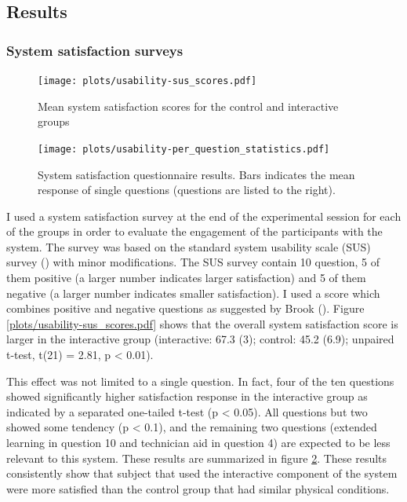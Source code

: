 \documentclass[a4paper,11pt]{article}
\begin{document}
{\subsection{Results}

\subsubsection{System satisfaction surveys}

\begin{figure}[!htb]
    \centering
    \texttt{[image: plots/usability-sus\_scores.pdf]}
    \caption{Mean system satisfaction scores for the control and interactive groups}\label{plot:usability-sus_scores}
\end{figure}

\begin{figure}[!htb]
    \centering
    \texttt{[image: plots/usability-per\_question\_statistics.pdf]}
    \caption{System satisfaction questionnaire results. Bars indicates the mean response of single questions (questions are listed to the right).}\label{plot:usability-per_question_statistics}
\end{figure}

I used a system satisfaction survey at the end of the experimental session for each of the groups in order to evaluate the engagement of the participants with the system.
The survey was based on the standard system usability scale (SUS) survey (\cite{brooke96}) with minor modifications.
The SUS survey contain 10 question, 5 of them positive (a larger number indicates larger satisfaction) and 5 of them negative (a larger number indicates smaller satisfaction).
I used a score which combines positive and negative questions as suggested by Brook (\cite*{brooke96}).
Figure \ref{plots/usability-sus_scores.pdf} shows that the overall system satisfaction score is larger in the interactive group (interactive: 67.3 (3); control: 45.2 (6.9); unpaired t-test, t(21) = 2.81, p \textless{} 0.01).

This effect was not limited to a single question.
In fact, four of the ten questions showed significantly higher satisfaction response in the interactive group as indicated by a separated one-tailed t-test (p \textless{} 0.05). All questions but two showed some tendency (p \textless{} 0.1), and the remaining two questions (extended learning in question 10 and technician aid in question 4) are expected to be less relevant to this system.
These results are summarized in figure \ref{plot:usability-per_question_statistics}.
These results consistently show that subject that used the interactive component of the system were more satisfied than the control group that had similar physical conditions.

}
\end{document}
